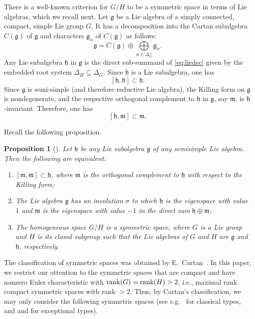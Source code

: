 \documentclass{amsart}
\newtheorem{proposition}[theorem]{Proposition}
\theoremstyle{definition}
\theoremstyle{remark}
\numberwithin{equation}{section}
\newcommand{\C}{{\mathbb{C}}}
\begin{document}
There is a well-known criterion for $G/H$ to be a symmetric space in terms of Lie algebras, which we recall next.
Let $\mathfrak{g}$ be a
Lie algebra of a simply connected, compact, simple Lie group $G$.
It has a decomposition into the Cartan subalgebra $C(\mathfrak{g})$ of $\mathfrak{g}$ and characters $\mathfrak{g}_{\alpha}$ of $C(\mathfrak{g})$ as follows:
\begin{equation}\label{eq:liedec}
\mathfrak{g}=C(\mathfrak{g})\oplus\bigoplus\limits_{\alpha\in\Delta^{+}_{G}} \mathfrak{g}_{\alpha}.
\end{equation}
Any Lie subalgebra $\mathfrak{h}$ in $\mathfrak{g}$ is the direct sub-summand of \eqref{eq:liedec} given by the embedded root system $\Delta_{H}\subseteq \Delta_{G}$.
Since $\mathfrak{h}$ is a Lie subalgebra, one has
\[
[\mathfrak{h},\mathfrak{h}]\subset \mathfrak{h}.
\]
Since $\mathfrak{g}$ is semi-simple (and therefore reductive Lie algebra), the Killing form on $\mathfrak{g}$ is nondegenerate, and the respective orthogonal complement to $\mathfrak{h}$ in $\mathfrak{g}$, say $\mathfrak{m}$, is $\mathfrak{h}$-invariant.
Therefore, one has
\[
[\mathfrak{h},\mathfrak{m}]\subset \mathfrak{m}.
\]

Recall the following proposition.
\begin{proposition}[{\cite[\S B.1]{Ba}}]\label{pr:symm}
Let $\mathfrak{h}$ be any Lie subalgebra $\mathfrak{g}$ of any semisimple Lie algebra. %
Then the following are equivalent:
\begin{enumerate}
\item $ [\mathfrak{m},\mathfrak{m}]\subset \mathfrak{h}$, where $\mathfrak{m}$ is the orthogonal complement to $\mathfrak{h}$ with respect to the Killing form;
\item The Lie algebra $\mathfrak{g}$ has an involution $\sigma$ to which $\mathfrak{h}$ is the eigenspace with value $1$ and $\mathfrak{m}$ is the eigenspace with value $-1$ in the direct sum $\mathfrak{h}\oplus \mathfrak{m}$;
\item The homogeneous space $G/H$ is a symmetric space, where $G$ is a Lie group and $H$ is its closed subgroup such that the Lie algebras of $G$ and $H$ are $\mathfrak{g}$ and $\mathfrak{h}$, respectively.
\end{enumerate}
\end{proposition}

The classification of symmetric spaces was obtained by E.~Cartan~\cite{C27}.
In this paper, we restrict our attention to the symmetric spaces that are compact and have nonzero Euler characteristic with ${\rm rank}(G)={\rm rank}(H)>2$, i.e., maximal rank compact symmetric spaces with rank $>2$. 
Thus, by Cartan's classification, we may only consider the following symmetric spaces
(see e.g.~\cite[Ch.X, \S6, Table V]{He} for classical types, and \cite[Ch.V, \S7, Remark 7.18--7.19]{MiTo} and \cite{Y25} for exceptional types).
\end{document}

